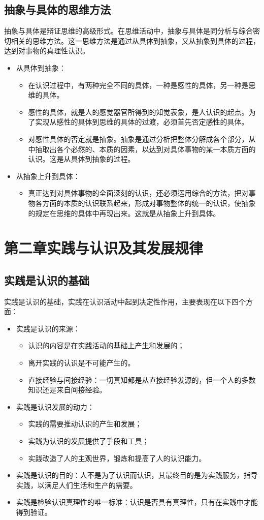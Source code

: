 \documentclass[12pt,openany]{ctexbook}
\begin{document}
\section{抽象与具体的思维方法}
抽象与具体是辩证思维的高级形式。在思维活动中，抽象与具体是同分析与综合密切相关的思维方法。这一思维方法是通过从具体到抽象，又从抽象到具体的过程，达到对事物的真理性认识。
\begin{itemize}
  \item 从具体到抽象：
\begin{itemize}
  \item 在认识过程中，有两种完全不同的具体，一种是感性的具体，另一种是思维的具体。
  \item 感性的具体，就是人的感觉器官所得到的知觉表象，是人认识的起点。为了实现从感性的具体到思维的具体的过渡，必须首先否定感性的具体。
  \item 对感性具体的否定就是抽象。抽象是通过分析把整体分解成各个部分，从中抽取出各个必然的、本质的因素，以达到对具体事物的某一本质方面的认识。这是从具体到抽象的过程。
\end{itemize}
  \item 从抽象上升到具体：
\begin{itemize}
  \item 真正达到对具体事物的全面深刻的认识，还必须运用综合的方法，把对事物各方面的本质的认识联系起来，形成对事物整体的统一的认识，使抽象的规定在思维的具体中再现出来。这就是从抽象上升到具体。
\end{itemize}
\end{itemize}
\chapter{第二章\quad{}实践与认识及其发展规律}
\section{实践是认识的基础}
实践是认识的基础，实践在认识活动中起到决定性作用，主要表现在以下四个方面：
\begin{itemize}
  \item 实践是认识的来源：
\begin{itemize}
  \item 认识的内容是在实践活动的基础上产生和发展的；
  \item 离开实践的认识是不可能产生的。
  \item 直接经验与间接经验：一切真知都是从直接经验发源的，但一个人的多数知识还是来自间接经验。
\end{itemize}
  \item 实践是认识发展的动力：
\begin{itemize}
  \item 实践的需要推动认识的产生和发展；
  \item 实践为认识的发展提供了手段和工具；
  \item 实践改造了人的主观世界，锻炼和提高了人的认识能力。
\end{itemize}
  \item 实践是认识的目的：人不是为了认识而认识，其最终目的是为实践服务，指导实践，以满足人们生活和生产的需要。
  \item 实践是检验认识真理性的唯一标准：认识是否具有真理性，只有在实践中才能得到验证。
\end{itemize}
\end{document}
